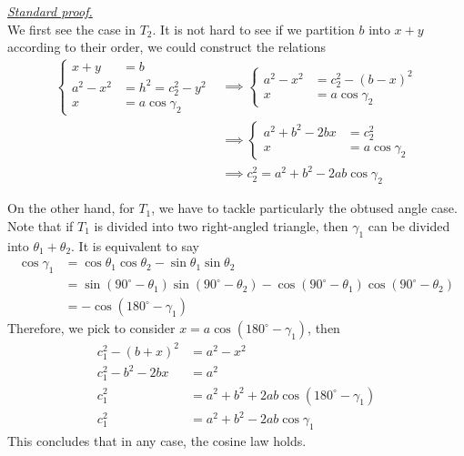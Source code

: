 \documentclass[12pt]{article}
\renewenvironment{proof}[1][Proof]{\begin{snugshade*} \underline{\textit{{#1}.}}\\}{\hfill \qedsymbol \end{snugshade*}}
\begin{document}
    \begin{proof}[Standard proof]
        We first see the case in $T_2$. It is not hard to see if we partition $b$ into $x+y$ according to their order, we could construct the relations \begin{align*}
            \begin{cases}
                x+y&=b\\
                a^2-x^2&=h^2=c_2^2-y^2\\
                x&=a\cos{\gamma_2}
            \end{cases}
            &\implies \begin{cases}
                a^2-x^2&=c_2^2-(b-x)^2\\
                x&=a\cos{\gamma_2}
            \end{cases}\\
            &\implies \begin{cases}
                a^2+b^2-2bx&=c_2^2\\
                x&=a\cos{\gamma_2}
            \end{cases}\\
            &\implies c_2^2=a^2+b^2-2ab\cos{\gamma_2}
        \end{align*}

        On the other hand, for $T_1$, we have to tackle particularly the obtused angle case. Note that if $T_1$ is divided into two right-angled triangle, then $\gamma_1$ can be divided into $\theta_1+\theta_2$. It is equivalent to say \begin{align*}
            \cos{\gamma_1}&=\cos{\theta_1}\cos{\theta_2}-\sin{\theta_1}\sin{\theta_2}\\
            &=\sin(90^\circ - \theta_1)\sin(90^\circ - \theta_2) - \cos(90^\circ - \theta_1)\cos(90^\circ - \theta_2)\\
            &=-\cos(180^\circ -\gamma_1)
        \end{align*}
        Therefore, we pick to consider $x=a\cos(180^\circ - \gamma_1)$, then \begin{align*}
            c_1^2 - (b+x)^2 &= a^2-x^2\\
            c_1^2 - b^2 - 2bx &= a^2\\
            c_1^2 &= a^2 + b^2 + 2ab\cos(180^\circ - \gamma_1)\\
            c_1^2 &= a^2 + b^2 - 2ab\cos{\gamma_1}
        \end{align*}
        This concludes that in any case, the cosine law holds.
    \end{proof}
\end{document}
